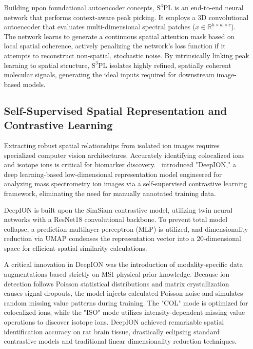 \documentclass[
12pt, %
oneside, %
english, %
onehalfspacing, %
nolistspacing, %
headsepline, %
]{MastersDoctoralThesis} %
\begin{document}
Building upon foundational autoencoder concepts, $\text{S}^{3}\text{PL}$ is an end-to-end neural network that performs context-aware peak picking. It employs a 3D convolutional autoencoder that evaluates multi-dimensional spectral patches ($x\in\mathbb{R}^{h\times w\times c}$). The network learns to generate a continuous spatial attention mask based on local spatial coherence, actively penalizing the network's loss function if it attempts to reconstruct non-spatial, stochastic noise. By intrinsically linking peak learning to spatial structure, $\text{S}^{3}\text{PL}$ isolates highly refined, spatially coherent molecular signals, generating the ideal inputs required for downstream image-based models.

\subsection{Self-Supervised Spatial Representation and Contrastive Learning}

Extracting robust spatial relationships from isolated ion images requires specialized computer vision architectures. Accurately identifying colocalized ions and isotope ions is critical for biomarker discovery.~\citet{guo2024deepion} introduced "DeepION," a deep learning-based low-dimensional representation model engineered for analyzing mass spectrometry ion images via a self-supervised contrastive learning framework, eliminating the need for manually annotated training data.

DeepION is built upon the SimSiam contrastive model, utilizing twin neural networks with a ResNet18 convolutional backbone. To prevent total model collapse, a prediction multilayer perceptron (MLP) is utilized, and dimensionality reduction via UMAP condenses the representation vector into a 20-dimensional space for efficient spatial similarity calculations.

A critical innovation in DeepION was the introduction of modality-specific data augmentations based strictly on MSI physical prior knowledge. Because ion detection follows Poisson statistical distributions and matrix crystallization causes signal dropouts, the model injects calculated Poisson noise and simulates random missing value patterns during training. The "COL" mode is optimized for colocalized ions, while the "ISO" mode utilizes intensity-dependent missing value operations to discover isotope ions. DeepION achieved remarkable spatial identification accuracy on rat brain tissue, drastically eclipsing standard contrastive models and traditional linear dimensionality reduction techniques.
\end{document}
